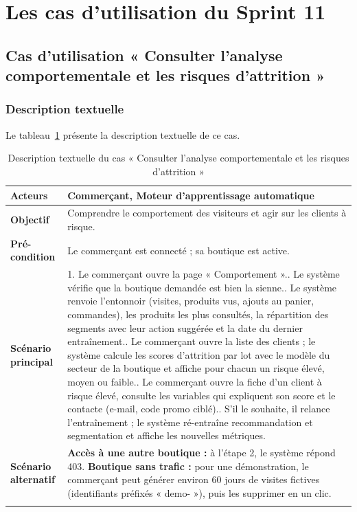 \section{Les cas d'utilisation du Sprint 11}
\subsection{Cas d'utilisation « Consulter l'analyse comportementale et les risques d'attrition »}
\subsubsection{Description textuelle}
Le tableau~\ref{tab:uc-comportement} présente la description textuelle de ce cas.
\renewcommand{\arraystretch}{1.5}
\begin{longtable}{|p{4cm}|p{11cm}|}
\hline
\textbf{Acteurs} & Commerçant, Moteur d'apprentissage automatique \\
\hline
\textbf{Objectif} & Comprendre le comportement des visiteurs et agir sur les clients à risque. \\
\hline
\textbf{Pré-condition} & Le commerçant est connecté ; sa boutique est active. \\
\hline
\textbf{Scénario principal} &
1. Le commerçant ouvre la page « Comportement ».\newline
2. Le système vérifie que la boutique demandée est bien la sienne.\newline
3. Le système renvoie l'entonnoir (visites, produits vus, ajouts au panier, commandes), les produits les plus consultés, la répartition des segments avec leur action suggérée et la date du dernier entraînement.\newline
4. Le commerçant ouvre la liste des clients ; le système calcule les scores d'attrition par lot avec le modèle du secteur de la boutique et affiche pour chacun un risque élevé, moyen ou faible.\newline
5. Le commerçant ouvre la fiche d'un client à risque élevé, consulte les variables qui expliquent son score et le contacte (e-mail, code promo ciblé).\newline
6. S'il le souhaite, il relance l'entraînement ; le système ré-entraîne recommandation et segmentation et affiche les nouvelles métriques. \\
\hline
\textbf{Scénario alternatif} &
\textbf{Accès à une autre boutique :} à l'étape 2, le système répond 403.\newline
\textbf{Boutique sans trafic :} pour une démonstration, le commerçant peut générer environ 60 jours de visites fictives (identifiants préfixés « demo- »), puis les supprimer en un clic. \\
\hline
\caption{Description textuelle du cas « Consulter l'analyse comportementale et les risques d'attrition »}
\label{tab:uc-comportement}
\end{longtable}

